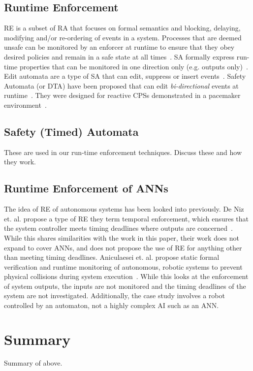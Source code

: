 \subsection{Runtime Enforcement}
\ac{RE} is a subset of \ac{RA} that focuses on formal semantics and blocking, delaying, modifying and/or re-ordering of events in a system. 
Processes that are deemed unsafe can be monitored by an enforcer at runtime to ensure that they obey desired policies and remain in a safe state at all times~\cite{theoryRE}. 
\ac{SA} formally express run-time properties that can be monitored in one direction only (e.g. outputs only)~\cite{enfsafepol}. 
Edit automata are a type of \ac{SA} that can edit, suppress or insert events~\cite{editautomata}. 
Safety Automata (or \ac{DTA}) have been proposed that can edit \textit{bi-directional} events at runtime~\cite{recps}. 
They were designed for reactive \acp{CPS} demonstrated in a pacemaker environment~\cite{recps}. 

\subsection{Safety (Timed) Automata}
These are used in our run-time enforcement techniques. Discuss these and how they work.

\subsection{Runtime Enforcement of \acp{ANN}}
The idea of \ac{RE} of autonomous systems has been looked into previously. 
De Niz et. al. propose a type of \ac{RE} they term temporal enforcement, which ensures that the system controller meets timing deadlines where outputs are concerned~\cite{safe-enforce-auto}. 
While this shares similarities with the work in this paper, their work does not expand to cover \acp{ANN}, and does not propose the use of \ac{RE} for anything other than meeting timing deadlines.
Aniculaesei et. al. propose static formal verification and runtime monitoring of autonomous, robotic systems to prevent physical collisions during system execution~\cite{runtime-monitor}.
While this looks at the enforcement of system outputs, the inputs are not monitored and the timing deadlines of the system are not investigated. 
Additionally, the case study involves a robot controlled by an automaton, not a highly complex \ac{AI} such as an \ac{ANN}.





\section{Summary}
Summary of above.

